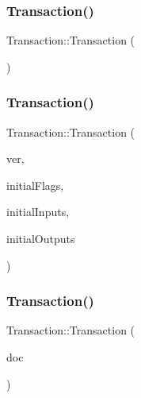 \subsubsection{\texorpdfstring{Transaction()}{Transaction()}\hspace{0.1cm}{\footnotesize\ttfamily [1/3]}}
{\footnotesize\ttfamily Transaction\+::\+Transaction (\begin{DoxyParamCaption}{ }\end{DoxyParamCaption})}

\mbox{\label{classTransaction_a5a8028d0c89a04fbc5547806bfad7f4e}} 
\subsubsection{\texorpdfstring{Transaction()}{Transaction()}\hspace{0.1cm}{\footnotesize\ttfamily [2/3]}}
{\footnotesize\ttfamily Transaction\+::\+Transaction (\begin{DoxyParamCaption}\item[{int}]{ver,  }\item[{std\+::vector$<$ std\+::string $>$}]{initial\+Flags,  }\item[{std\+::vector$<$ \mbox{\hyperlink{structInputTransaction}{Input\+Transaction}} $>$}]{initial\+Inputs,  }\item[{std\+::vector$<$ \mbox{\hyperlink{structOutputTransaction}{Output\+Transaction}} $>$}]{initial\+Outputs }\end{DoxyParamCaption})}

\mbox{\label{classTransaction_a53699ce216993c3350d299aef80635d5}} 
\subsubsection{\texorpdfstring{Transaction()}{Transaction()}\hspace{0.1cm}{\footnotesize\ttfamily [3/3]}}
{\footnotesize\ttfamily Transaction\+::\+Transaction (\begin{DoxyParamCaption}\item[{rapidjson\+::\+Document $\ast$}]{doc }\end{DoxyParamCaption})\hspace{0.3cm}{\ttfamily [explicit]}}



